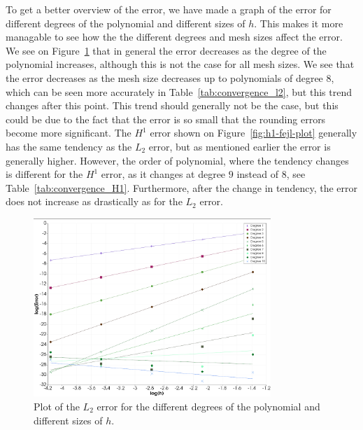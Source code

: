 To get a better overview of the error, 
we have made a graph of the error for different degrees of the polynomial 
and different sizes of $h$.
This makes it more managable to see how the the different degrees and mesh 
sizes affect the error. 
We see on Figure~\ref{fig:l2-fejl-plot} that in general the error 
decreases as the degree of the polynomial increases, 
although this is not the case for all mesh sizes.
We see that the error decreases as the mesh size decreases up 
to polynomials of degree $8$, 
which can be seen more accurately in Table~\ref{tab:convergence_l2}, 
but this trend changes after this point.
This trend should generally not be the case, 
but this could be due to the fact that the error is so small that the 
rounding errors become more significant.
The $H^1$ error shown on Figure~\ref{fig:h1-fejl-plot} generally 
has the same tendency as the $L_2$ error, 
but as mentioned earlier the error is generally higher.
However, the order of polynomial, where the tendency changes is 
different for the $H^1$ error, as it changes at degree $9$ instead of $8$, 
see Table~\ref{tab:convergence_H1}.
Furthermore, after the change in tendency, 
the error does not increase as drastically as for the $L_2$ error. 

\begin{figure}
    \begin{centering}
    \includegraphics[width=0.8\textwidth]{Afsnit/Application/figurer/l2-fejl-plot.jpeg}
    \caption{Plot of the $L_2$ error for the different degrees of the polynomial and different sizes of $h$.}
    \label{fig:l2-fejl-plot}
    \end{centering}
\end{figure}


